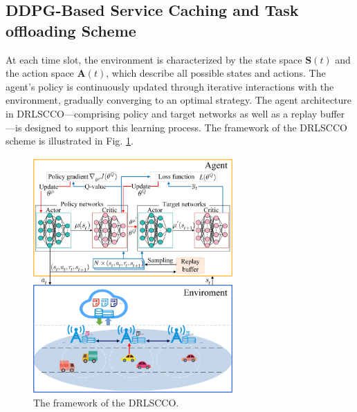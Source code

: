 \documentclass[lettersize,journal]{IEEEtran}
\begin{document}
\subsection{DDPG-Based Service Caching and Task offloading Scheme}
At each time slot, the environment is characterized by the state space $ \mathbf{S}(t) $  and the action space $ \mathbf{A}(t) $, which describe all possible states and actions.
The agent's  policy is continuously updated through iterative interactions with the environment, gradually converging to an optimal strategy. The agent architecture in DRLSCCO—comprising policy and target networks as well as a replay buffer—is designed to support this learning process. The framework of the DRLSCCO scheme is illustrated in Fig. \ref{fig: DRLSCCO}.
\begin{figure}[!t]
	\centering
	\includegraphics[width=3in]{DRLSCCO.png}
	\caption{The framework of the DRLSCCO.}
	\label{fig: DRLSCCO}
\end{figure}
\end{document}
